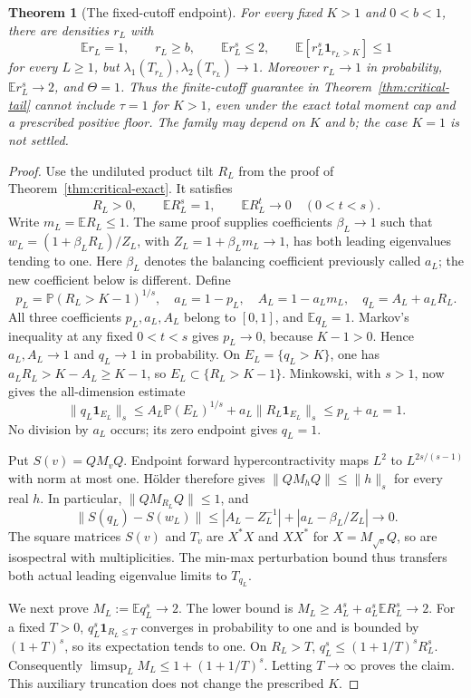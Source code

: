\documentclass[11pt]{article}
\newtheorem{theorem}{Theorem}
\begin{document}
\begin{theorem}[The fixed-cutoff endpoint]\label{thm:finite-tail-endpoint}
For every fixed $K>1$ and $0<b<1$, there are densities $r_L$ with
\[
 \mathbb E r_L=1,\qquad r_L\ge b,\qquad \mathbb E r_L^s\le2,
 \qquad \mathbb E[r_L^s\mathbf1_{r_L>K}]\le1
\]
for every $L\ge1$, but $\lambda_1(T_{r_L}),\lambda_2(T_{r_L})\to1$.
Moreover $r_L\to1$ in probability, $\mathbb E r_L^s\to2$, and
$\Theta=1$. Thus the finite-cutoff guarantee in
Theorem~\ref{thm:critical-tail} cannot include $\tau=1$ for $K>1$,
even under the exact total moment cap and a prescribed positive floor.
The family may depend on $K$ and $b$; the case $K=1$ is not settled.
\end{theorem}
\begin{proof}
Use the undiluted product tilt $R_L$ from the proof of
Theorem~\ref{thm:critical-exact}. It satisfies
\[
 R_L>0,\qquad \mathbb E R_L^s=1,\qquad
 \mathbb E R_L^t\longrightarrow0\quad(0<t<s).
\]
Write $m_L=\mathbb E R_L\le1$. The same proof supplies coefficients
$\beta_L\to1$ such that $w_L=(1+\beta_LR_L)/Z_L$, with
$Z_L=1+\beta_Lm_L\to1$, has both leading eigenvalues tending to one.
Here $\beta_L$ denotes the balancing coefficient previously called
$a_L$; the new coefficient below is different.
Define
\[
 p_L=\mathbb P(R_L>K-1)^{1/s},\quad a_L=1-p_L,\quad
 A_L=1-a_Lm_L,\quad q_L=A_L+a_LR_L.
\]
All three coefficients $p_L,a_L,A_L$ belong to $[0,1]$, and
$\mathbb E q_L=1$. Markov's inequality at any fixed $0<t<s$ gives
$p_L\to0$, because $K-1>0$. Hence $a_L,A_L\to1$ and
$q_L\to1$ in probability. On $E_L=\{q_L>K\}$, one has
$a_LR_L>K-A_L\ge K-1$, so $E_L\subset\{R_L>K-1\}$.
Minkowski, with $s>1$, now gives the all-dimension estimate
\[
 \|q_L\mathbf1_{E_L}\|_s
 \le A_L\mathbb P(E_L)^{1/s}+a_L\|R_L\mathbf1_{E_L}\|_s
 \le p_L+a_L=1.
\]
No division by $a_L$ occurs; its zero endpoint gives $q_L=1$.

Put $S(v)=QM_vQ$. Endpoint forward hypercontractivity maps $L^2$
to $L^{2s/(s-1)}$ with norm at most one. H\"older therefore gives
$\|QM_hQ\|\le\|h\|_s$ for every real $h$. In particular,
$\|QM_{R_L}Q\|\le1$, and
\[
 \|S(q_L)-S(w_L)\|
 \le |A_L-Z_L^{-1}|+|a_L-\beta_L/Z_L|\longrightarrow0.
\]
The square matrices $S(v)$ and $T_v$ are $X^*X$ and $XX^*$ for
$X=M_{\sqrt v}Q$, so are isospectral with multiplicities. The
min-max perturbation bound thus transfers both actual leading
eigenvalue limits to $T_{q_L}$.

We next prove $M_L:=\mathbb E q_L^s\to2$. The lower bound is
$M_L\ge A_L^s+a_L^s\mathbb E R_L^s\to2$. For a fixed $T>0$,
$q_L^s\mathbf1_{R_L\le T}$ converges in probability to one and is
bounded by $(1+T)^s$, so its expectation tends to one. On $R_L>T$,
$q_L^s\le(1+1/T)^sR_L^s$. Consequently
$\limsup_L M_L\le1+(1+1/T)^s$. Letting $T\to\infty$ proves the
claim. This auxiliary truncation does not change the prescribed $K$.


\end{proof}
\end{document}
